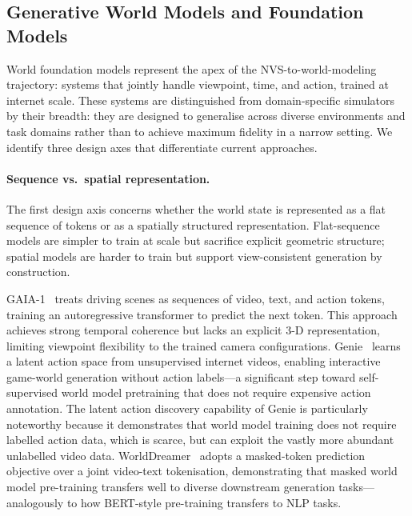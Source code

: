 \subsection{Generative World Models and Foundation Models}

World foundation models represent the apex of the NVS-to-world-modeling
trajectory: systems that jointly handle viewpoint, time, and action, trained
at internet scale.
These systems are distinguished from domain-specific simulators by their
breadth: they are designed to generalise across diverse environments and task
domains rather than to achieve maximum fidelity in a narrow setting.
We identify three design axes that differentiate current approaches.

\paragraph{Sequence vs.\ spatial representation.}
The first design axis concerns whether the world state is represented
as a flat sequence of tokens or as a spatially structured representation.
Flat-sequence models are simpler to train at scale but sacrifice explicit
geometric structure; spatial models are harder to train but support
view-consistent generation by construction.

GAIA-1~\citep{hu2023gaia} treats driving scenes as sequences of video, text,
and action tokens, training an autoregressive transformer to predict the next
token.
This approach achieves strong temporal coherence but lacks an explicit 3-D
representation, limiting viewpoint flexibility to the trained camera configurations.
Genie~\citep{bruce2024genie} learns a latent action space from unsupervised
internet videos, enabling interactive game-world generation without action
labels---a significant step toward self-supervised world model pretraining
that does not require expensive action annotation.
The latent action discovery capability of Genie is particularly noteworthy
because it demonstrates that world model training does not require labelled
action data, which is scarce, but can exploit the vastly more abundant
unlabelled video data.
WorldDreamer~\citep{worlddreamer2024} adopts a masked-token prediction
objective over a joint video-text tokenisation, demonstrating that masked
world model pre-training transfers well to diverse downstream generation
tasks---analogously to how BERT-style pre-training transfers to NLP tasks.

